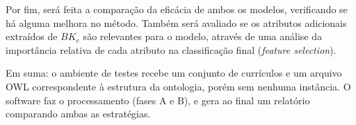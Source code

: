 Por fim, será feita a comparação da eficácia de ambos os modelos, verificando se há alguma melhora no método. Também será avaliado se os atributos adicionais extraídos de $BK_e$ são relevantes para o modelo, através de uma análise da importância relativa de cada atributo na classificação final (\textit{feature selection}).

Em suma: o ambiente de testes recebe um conjunto de currículos e um arquivo OWL correspondente à estrutura da ontologia, porém sem nenhuma instância. O software faz o processamento (fases A e B), e gera ao final um relatório comparando ambas as estratégias.
